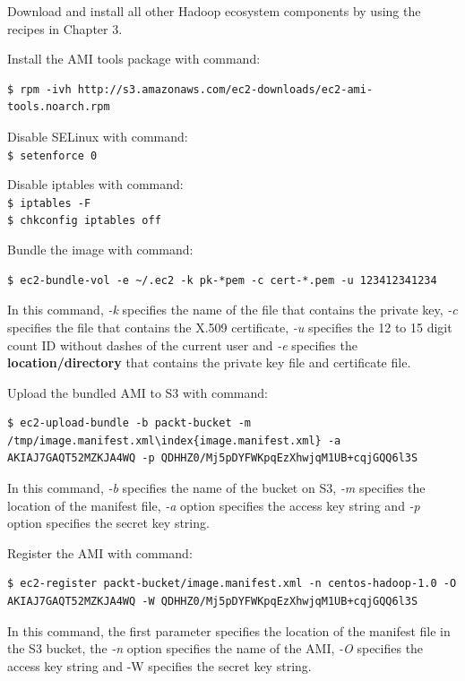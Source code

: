 Download and install all other Hadoop ecosystem components by using the recipes in Chapter 3.


Install the AMI tools package with command:
\lstset{style=bashstyle}
\begin{lstlisting}
$ rpm -ivh http://s3.amazonaws.com/ec2-downloads/ec2-ami-tools.noarch.rpm
\end{lstlisting}

Disable SELinux with command:\\
\verb|$ setenforce 0|


Disable iptables with command: \\
\verb|$ iptables -F| \\
\verb|$ chkconfig iptables off|

Bundle the image with command:
\lstset{style=bashstyle}
\begin{lstlisting}
$ ec2-bundle-vol -e ~/.ec2 -k pk-*pem -c cert-*.pem -u 123412341234
\end{lstlisting}

In this command, \emph{-k} specifies the name of the file that contains the private key, \emph{-c} specifies the file that contains the X.509 certificate, \emph{-u} specifies the 12 to 15 digit count ID without dashes of the current user and \emph{-e} specifies the \textbf{location/directory} that contains the private key file and certificate file.


Upload the bundled AMI to S3 with command: 
\lstset{style=bashstyle}
\begin{lstlisting}
$ ec2-upload-bundle -b packt-bucket -m /tmp/image.manifest.xml\index{image.manifest.xml} -a AKIAJ7GAQT52MZKJA4WQ -p QDHHZ0/Mj5pDYFWKpqEzXhwjqM1UB+cqjGQQ6l3S
\end{lstlisting}

In this command, \emph{-b} specifies the name of the bucket on S3, \emph{-m} specifies the location of the manifest file, \emph{-a} option specifies the access key string and \emph{-p} option specifies the secret key string.

Register the AMI with command:
\lstset{style=bashstyle}
\begin{lstlisting}
$ ec2-register packt-bucket/image.manifest.xml -n centos-hadoop-1.0 -O AKIAJ7GAQT52MZKJA4WQ -W QDHHZ0/Mj5pDYFWKpqEzXhwjqM1UB+cqjGQQ6l3S
\end{lstlisting}

In this command, the first parameter specifies the location of the manifest file in the S3 bucket, the \emph{-n} option specifies the name of the AMI, \emph{-O} specifies the access key string and -W specifies the secret key string.

